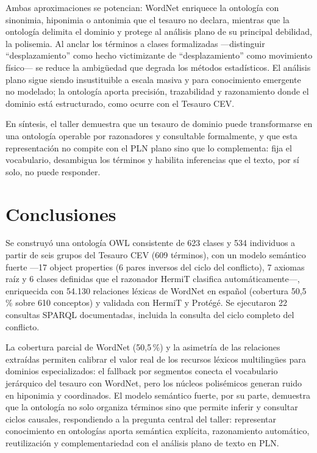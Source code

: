 \documentclass[11pt]{tg_usta}
\begin{document}
Ambas aproximaciones se potencian: WordNet enriquece la ontología con sinonimia, hiponimia o antonimia que el tesauro no declara, mientras que la ontología delimita el dominio y protege al análisis plano de su principal debilidad, la polisemia. Al anclar los términos a clases formalizadas ---distinguir ``desplazamiento'' como hecho victimizante de ``desplazamiento'' como movimiento físico--- se reduce la ambigüedad que degrada los métodos estadísticos. El análisis plano sigue siendo insustituible a escala masiva y para conocimiento emergente no modelado; la ontología aporta precisión, trazabilidad y razonamiento donde el dominio está estructurado, como ocurre con el Tesauro CEV.

En síntesis, el taller demuestra que un tesauro de dominio puede transformarse en una ontología operable por razonadores y consultable formalmente, y que esta representación no compite con el PLN plano sino que lo complementa: fija el vocabulario, desambigua los términos y habilita inferencias que el texto, por sí solo, no puede responder.


\section{Conclusiones}

Se construyó una ontología OWL consistente de 623 clases y 534 individuos a partir de seis grupos del Tesauro CEV (609 términos), con un modelo semántico fuerte ---17 object properties (6 pares inversos del ciclo del conflicto), 7 axiomas raíz y 6 clases definidas que el razonador HermiT clasifica automáticamente---, enriquecida con 54.130 relaciones léxicas de WordNet en español (cobertura 50,5\,\% sobre 610 conceptos) y validada con HermiT y Protégé. Se ejecutaron 22 consultas SPARQL documentadas, incluida la consulta del ciclo completo del conflicto.

La cobertura parcial de WordNet (50,5\,\%) y la asimetría de las relaciones extraídas permiten calibrar el valor real de los recursos léxicos multilingües para dominios especializados: el fallback por segmentos conecta el vocabulario jerárquico del tesauro con WordNet, pero los núcleos polisémicos generan ruido en hiponimia y coordinados. El modelo semántico fuerte, por su parte, demuestra que la ontología no solo organiza términos sino que permite inferir y consultar ciclos causales, respondiendo a la pregunta central del taller: representar conocimiento en ontologías aporta semántica explícita, razonamiento automático, reutilización y complementariedad con el análisis plano de texto en PLN.


\nocite{*}

\newpage

\end{document}
